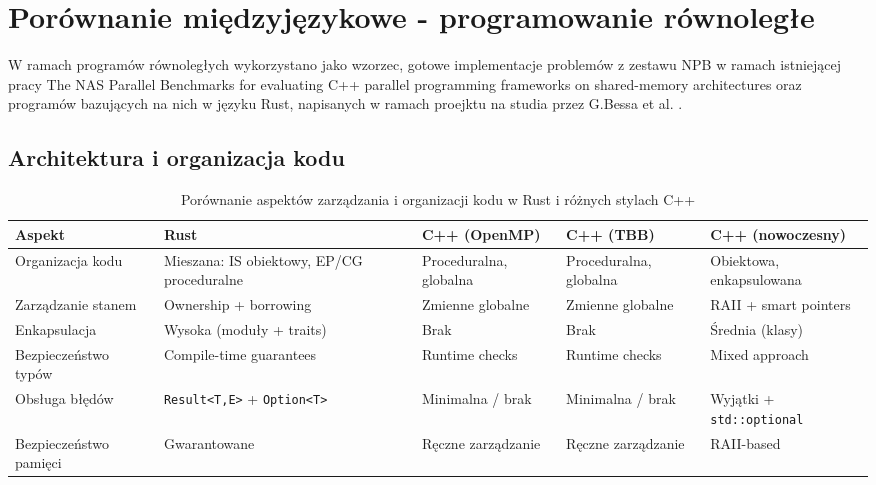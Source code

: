 \chapter{Porównanie międzyjęzykowe - programowanie równoległe}
W ramach programów równoległych wykorzystano jako wzorzec, gotowe implementacje problemów z zestawu NPB w ramach istniejącej pracy The NAS Parallel Benchmarks for evaluating C++ parallel programming frameworks on shared-memory architectures \cite{CPPNPB} oraz programów bazujących na nich w języku Rust, napisanych w ramach proejktu na studia przez G.Bessa et al. \cite{NPBRust}.






\section{Architektura i organizacja kodu}
\begin{table}[H]
    \centering
    \caption{Porównanie aspektów zarządzania i organizacji kodu w Rust i różnych stylach C++}
    \begin{tabularx}{\textwidth}{lXXXX}
    \toprule
    \textbf{Aspekt} &
    \textbf{Rust} &
    \textbf{C++ (OpenMP)} &
    \textbf{C++ (TBB)} &
    \textbf{C++ (nowoczesny)} \\
    \midrule
    Organizacja kodu &
    Mieszana: IS obiektowy, EP/CG proceduralne &
    Proceduralna, globalna &
    Proceduralna, globalna &
    Obiektowa, enkapsulowana \\
    \hline
    Zarządzanie stanem &
    Ownership + borrowing &
    Zmienne globalne &
    Zmienne globalne &
    RAII + smart pointers \\
    \hline
    Enkapsulacja &
    Wysoka (moduły + traits) &
    Brak &
    Brak &
    Średnia (klasy) \\
    \hline
    Bezpieczeństwo typów &
    Compile-time guarantees &
    Runtime checks &
    Runtime checks &
    Mixed approach \\
    \hline
    Obsługa błędów &
    \texttt{Result<T,E>} + \texttt{Option<T>} &
    Minimalna / brak &
    Minimalna / brak &
    Wyjątki + \texttt{std::optional} \\
    \hline
    Bezpieczeństwo pamięci &
    Gwarantowane &
    Ręczne zarządzanie &
    Ręczne zarządzanie &
    RAII-based \\
    \bottomrule
    \end{tabularx}
\end{table}

